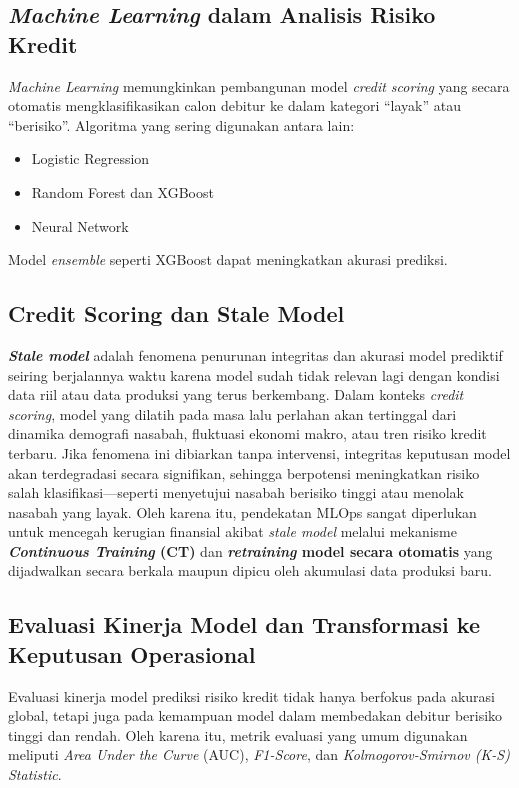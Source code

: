 \subsection{\textit{Machine Learning} dalam Analisis Risiko Kredit}
\textit{Machine Learning} memungkinkan pembangunan model \textit{credit scoring} yang secara otomatis mengklasifikasikan calon debitur ke dalam kategori “layak” atau “berisiko”. Algoritma yang sering digunakan antara lain:
\begin{itemize}
    \item Logistic Regression
    \item Random Forest dan XGBoost
    \item Neural Network
\end{itemize}
Model \textit{ensemble} seperti XGBoost dapat meningkatkan akurasi prediksi.\cite{mlopsbanking2025}

\subsection{Credit Scoring dan Stale Model}
\textbf{\textit{Stale model}} adalah fenomena penurunan integritas dan akurasi model prediktif seiring berjalannya waktu karena model sudah tidak relevan lagi dengan kondisi data riil atau data produksi yang terus berkembang. Dalam konteks \textit{credit scoring}, model yang dilatih pada masa lalu perlahan akan tertinggal dari dinamika demografi nasabah, fluktuasi ekonomi makro, atau tren risiko kredit terbaru. Jika fenomena ini dibiarkan tanpa intervensi, integritas keputusan model akan terdegradasi secara signifikan, sehingga berpotensi meningkatkan risiko salah klasifikasi---seperti menyetujui nasabah berisiko tinggi atau menolak nasabah yang layak. Oleh karena itu, pendekatan MLOps sangat diperlukan untuk mencegah kerugian finansial akibat \textit{stale model} melalui mekanisme \textbf{\textit{Continuous Training} (CT)} dan \textbf{\textit{retraining} model secara otomatis} yang dijadwalkan secara berkala maupun dipicu oleh akumulasi data produksi baru. \cite{nikolaidis2022credit}

\subsection{Evaluasi Kinerja Model dan Transformasi ke Keputusan Operasional}

Evaluasi kinerja model prediksi risiko kredit tidak hanya berfokus pada akurasi global, tetapi juga pada kemampuan model dalam membedakan debitur berisiko tinggi dan rendah. Oleh karena itu, metrik evaluasi yang umum digunakan meliputi \textit{Area Under the Curve} (AUC), \textit{F1-Score}, dan \textit{Kolmogorov-Smirnov (K-S) Statistic}.\cite{venkatsai2025validation}


